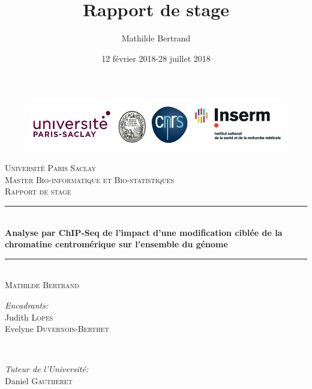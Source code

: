 \documentclass[a4paper,12pt,times]{report}
\title{Rapport de stage}
\author{Mathilde Bertrand}
\date{12 février 2018-28 juillet 2018}
\begin{document}

\makeatletter
  \begin{titlepage}
    \newcommand{\HRule}{\rule{\linewidth}{0.5mm}} %
      \center %
      \begin{figure}[t]
\centering
    \includegraphics[scale=0.6]{logo.png}\hfill
\end{figure}
      \textsc{\LARGE Université Paris Saclay}\\[0.5cm] %
      \textsc{\Large Master Bio-informatique et Bio-statistiques}\\[0.5cm] %
      \textsc{\large Rapport de stage}\\[0.9cm]
  
      \HRule \\[0.3cm]
      	{ \huge \bfseries Analyse par ChIP-Seq de l’impact d’une modification ciblée de la 
chromatine centromérique sur l’ensemble du génome\\[0.2cm] %
 }\HRule \\[0.3cm]
\textsc{\Large  Mathilde \textsc{Bertrand}}\\[2.5cm]
\begin{minipage}{0.6\textwidth}
\begin{flushleft} \large
\emph{Encadrants:} \\
Judith\textsc{ Lopes}\\ %
Evelyne\textsc{ Duvernois-Berthet}
\end{flushleft}
\end{minipage}
~
\begin{minipage}{0.35\textwidth}
\begin{flushright} \large
\emph{Tuteur de l'Université:}\\
Daniel \textsc{ Gautheret}
\end{flushright}
\end{minipage}\\[2cm]


\end{titlepage}
\end{document}
